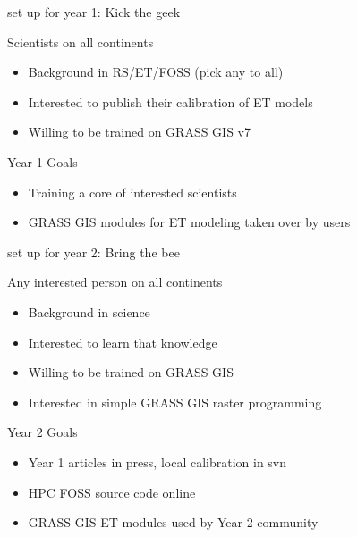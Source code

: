 \documentclass[xcolor=dvipsnames,beamer]{beamer} %
\begin{document}
\begin{frame}[fragile]{set up for year 1: Kick the geek}

Scientists on all continents
\begin{itemize}
 \item Background in RS/ET/FOSS (pick any to all)
 \item Interested to publish their calibration of ET models
 \item Willing to be trained on GRASS GIS v7
\end{itemize}


\begin{block}{Year 1 Goals}
\begin{itemize}
 \item Training a core of interested scientists
 \item GRASS GIS modules for ET modeling taken over by users
\end{itemize}
\end{block}

\end{frame}

\begin{frame}[fragile]{set up for year 2: Bring the bee}

Any interested person on all continents
\begin{itemize}
 \item Background in science
 \item Interested to learn that knowledge
 \item Willing to be trained on GRASS GIS
 \item Interested in simple GRASS GIS raster programming
\end{itemize}

\begin{block}{Year 2 Goals}
\begin{itemize}
 \item Year 1 articles in press, local calibration in svn
 \item HPC FOSS source code online
 \item GRASS GIS ET modules used by Year 2 community
\end{itemize}
\end{block}

\end{frame}
\end{document}
